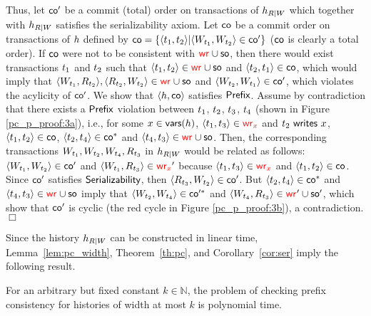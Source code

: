  Thus, let $\co'$ be a commit (total) order on transactions of $\hist_{R|W}$ which together with $\hist_{R|W}$ satisfies the serializability axiom.
 Let $\co$ be a commit order on transactions of $\hist$ defined by 
 $\co = \{\tup{\tr_1, \tr_2} | \tup{W_{\tr_1}, W_{\tr_2}} \in \co'\}$ ($\co$ is clearly a total order). If $\co$ were not to be consistent with $\wro \cup \so$, then there would exist transactions $\tr_1$ and $\tr_2$ such that  $\tup{\tr_1, \tr_2} \in \wro \cup \so$ and $\tup{\tr_2, \tr_1} \in \co$, which would imply that $\tup{W_{\tr_1}, R_{\tr_2}} , \tup{R_{\tr_2}, W_{\tr_2}} \in \wro \cup \so$ and $\tup{W_{\tr_2}, W_{\tr_1}} \in \co'$, which violates the acylicity of $\co'$. We show that $\tup{\hist, \co}$ satisfies $\axpre$. Assume by contradiction that there exists a $\axpre$ violation between $\tr_1$, $\tr_2$, $\tr_3$, $\tr_4$ (shown in Figure \ref{pc_p_proof:3a}), i.e., for some $\xvar \in \vars{\hist}$, $\tup{\tr_1, \tr_3} \in \wro[\xvar]$ and $\writeVar{\tr_2}{\xvar}$, $\tup{\tr_1, \tr_2} \in \co$, $\tup{\tr_2, \tr_4} \in \co^*$ and $\tup{\tr_4, \tr_3} \in \wro \cup \so$. Then, the corresponding transactions $W_{\tr_1}, W_{\tr_2}, W_{\tr_4}, R_{\tr_3}$ in $\hist_{R|W}$ would be related as follows: 
$\tup{W_{\tr_1}, W_{\tr_2}} \in \co'$ and $\tup{W_{\tr_1}, R_{\tr_3}} \in \wro[\xvar]'$ because $\tup{\tr_1, \tr_3} \in \wro[\xvar]$ and $\tup{\tr_1, \tr_2} \in \co$.
        Since $\co'$ satisfies $\axser$, then $\tup{R_{\tr_3}, W_{\tr_2}} \in \co'$.
        But $\tup{\tr_2, \tr_4} \in \co^*$ and $\tup{\tr_4, \tr_3} \in \wro \cup \so$ imply that $\tup{W_{\tr_2}, W_{\tr_4}} \in \co'^*$ and $\tup{W_{\tr_4}, R_{\tr_3}} \in \wro' \cup \so'$, which show that $\co'$ is cyclic (the red cycle in Figure \ref{pc_p_proof:3b}), a contradiction. \hfill $\Box$

 
 
 
 
Since the history $\hist_{R|W}$ can be constructed in linear time, Lemma~\ref{lem:pc_width}, Theorem~\ref{th:pc}, and Corollary~\ref{cor:ser} imply the following result.
 
 \begin{corollary}\label{cor:pc}
 
For an arbitrary but fixed constant $k\in\mathbb{N}$, the problem of checking prefix consistency for histories of width at most $k$ is polynomial time.
 \end{corollary}
 
